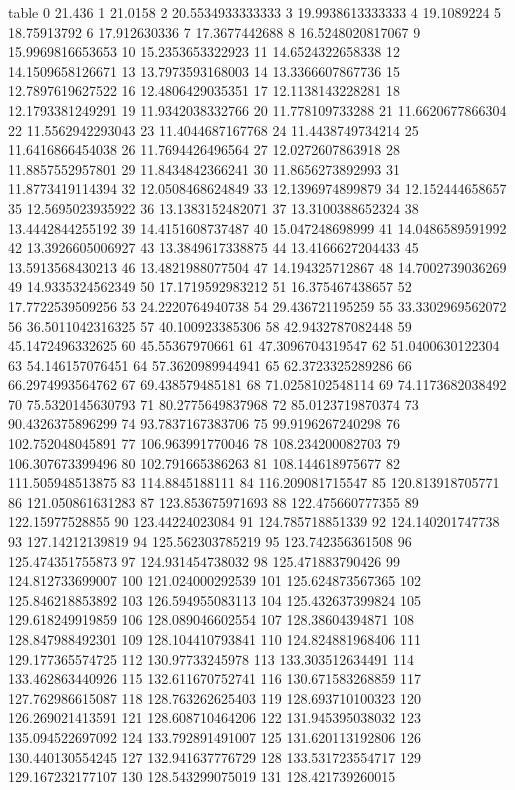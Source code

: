 table {%
0 21.436
1 21.0158
2 20.5534933333333
3 19.9938613333333
4 19.1089224
5 18.75913792
6 17.912630336
7 17.3677442688
8 16.5248020817067
9 15.9969816653653
10 15.2353653322923
11 14.6524322658338
12 14.1509658126671
13 13.7973593168003
14 13.3366607867736
15 12.7897619627522
16 12.4806429035351
17 12.1138143228281
18 12.1793381249291
19 11.9342038332766
20 11.778109733288
21 11.6620677866304
22 11.5562942293043
23 11.4044687167768
24 11.4438749734214
25 11.6416866454038
26 11.7694426496564
27 12.0272607863918
28 11.8857552957801
29 11.8434842366241
30 11.8656273892993
31 11.8773419114394
32 12.0508468624849
33 12.1396974899879
34 12.152444658657
35 12.5695023935922
36 13.1383152482071
37 13.3100388652324
38 13.4442844255192
39 14.4151608737487
40 15.047248698999
41 14.0486589591992
42 13.3926605006927
43 13.3849617338875
44 13.4166627204433
45 13.5913568430213
46 13.4821988077504
47 14.194325712867
48 14.7002739036269
49 14.9335324562349
50 17.1719592983212
51 16.375467438657
52 17.7722539509256
53 24.2220764940738
54 29.436721195259
55 33.3302969562072
56 36.5011042316325
57 40.100923385306
58 42.9432787082448
59 45.1472496332625
60 45.55367970661
61 47.3096704319547
62 51.0400630122304
63 54.146157076451
64 57.3620989944941
65 62.3723325289286
66 66.2974993564762
67 69.438579485181
68 71.0258102548114
69 74.1173682038492
70 75.5320145630793
71 80.2775649837968
72 85.0123719870374
73 90.4326375896299
74 93.7837167383706
75 99.9196267240298
76 102.752048045891
77 106.963991770046
78 108.234200082703
79 106.307673399496
80 102.791665386263
81 108.144618975677
82 111.505948513875
83 114.8845188111
84 116.209081715547
85 120.813918705771
86 121.050861631283
87 123.853675971693
88 122.475660777355
89 122.15977528855
90 123.44224023084
91 124.785718851339
92 124.140201747738
93 127.14212139819
94 125.562303785219
95 123.742356361508
96 125.474351755873
97 124.931454738032
98 125.471883790426
99 124.812733699007
100 121.024000292539
101 125.624873567365
102 125.846218853892
103 126.594955083113
104 125.432637399824
105 129.618249919859
106 128.089046602554
107 128.38604394871
108 128.847988492301
109 128.104410793841
110 124.824881968406
111 129.177365574725
112 130.97733245978
113 133.303512634491
114 133.462863440926
115 132.611670752741
116 130.671583268859
117 127.762986615087
118 128.763262625403
119 128.693710100323
120 126.269021413591
121 128.608710464206
122 131.945395038032
123 135.094522697092
124 133.792891491007
125 131.620113192806
126 130.440130554245
127 132.941637776729
128 133.531723554717
129 129.167232177107
130 128.543299075019
131 128.421739260015
}
